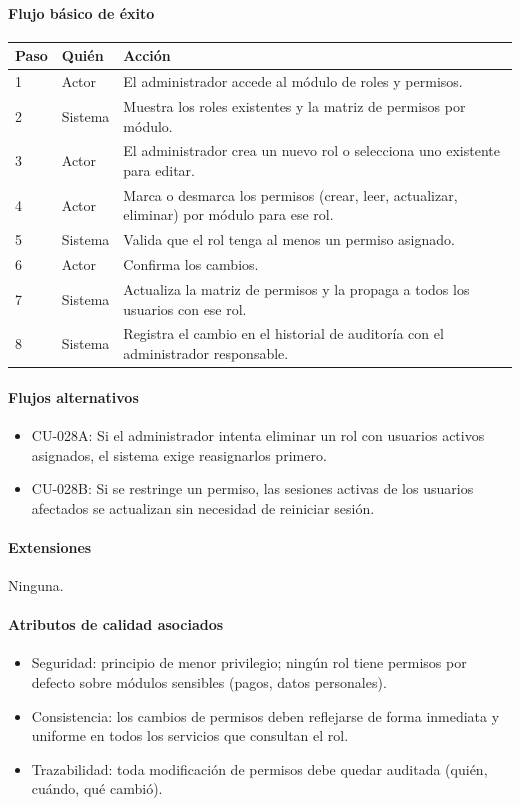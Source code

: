 \paragraph{Flujo básico de éxito}
\begin{longtable}{P{1.1cm}P{1.8cm}P{10.5cm}}
\toprule
\textbf{Paso} & \textbf{Quién} & \textbf{Acción}\\
\midrule
{} & Actor & El administrador accede al módulo de roles y permisos.\\
2 & Sistema & Muestra los roles existentes y la matriz de permisos por módulo.\\
3 & Actor & El administrador crea un nuevo rol o selecciona uno existente para editar.\\
4 & Actor & Marca o desmarca los permisos (crear, leer, actualizar, eliminar) por módulo para ese rol.\\
5 & Sistema & Valida que el rol tenga al menos un permiso asignado.\\
6 & Actor & Confirma los cambios.\\
7 & Sistema & Actualiza la matriz de permisos y la propaga a todos los usuarios con ese rol.\\
8 & Sistema & Registra el cambio en el historial de auditoría con el administrador responsable.\\
\bottomrule
\end{longtable}

\paragraph{Flujos alternativos}
\begin{itemize}[leftmargin=1.4em, topsep=1pt]
  \item CU-028A: Si el administrador intenta eliminar un rol con usuarios activos asignados, el sistema exige reasignarlos primero.
  \item CU-028B: Si se restringe un permiso, las sesiones activas de los usuarios afectados se actualizan sin necesidad de reiniciar sesión.
\end{itemize}

\paragraph{Extensiones}
Ninguna.

\paragraph{Atributos de calidad asociados}
\begin{itemize}[leftmargin=1.4em, topsep=1pt]
  \item Seguridad: principio de menor privilegio; ningún rol tiene permisos por defecto sobre módulos sensibles (pagos, datos personales).
  \item Consistencia: los cambios de permisos deben reflejarse de forma inmediata y uniforme en todos los servicios que consultan el rol.
  \item Trazabilidad: toda modificación de permisos debe quedar auditada (quién, cuándo, qué cambió).
\end{itemize}


